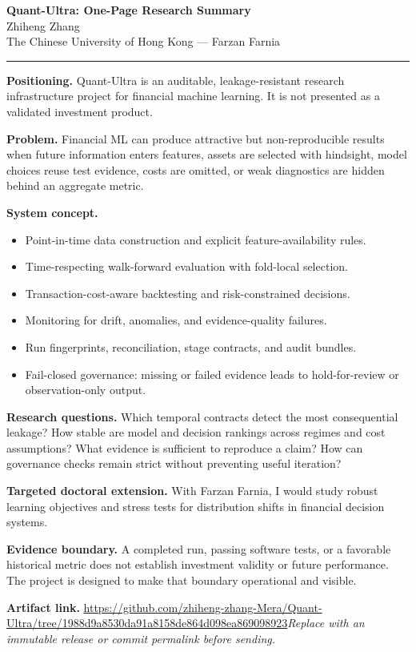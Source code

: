 \documentclass[11pt]{article}
\newcommand{\ApplicantName}{Zhiheng Zhang}
\newcommand{\ApplicantGitHub}{\url{https://github.com/zhiheng-zhang-Mera/Quant-Ultra/tree/1988d9a8530da91a8158de864d098ea869098923}}
\begin{document}
\begin{center}
{\LARGE\bfseries Quant-Ultra: One-Page Research Summary}\\[0.25em]
{\large \ApplicantName}\\
The Chinese University of Hong Kong --- Farzan Farnia
\end{center}
\vspace{0.35em}\hrule\vspace{0.65em}

\textbf{Positioning.} Quant-Ultra is an auditable, leakage-resistant research infrastructure project for financial machine learning. It is not presented as a validated investment product.

\textbf{Problem.} Financial ML can produce attractive but non-reproducible results when future information enters features, assets are selected with hindsight, model choices reuse test evidence, costs are omitted, or weak diagnostics are hidden behind an aggregate metric.

\textbf{System concept.}
\begin{itemize}
\item Point-in-time data construction and explicit feature-availability rules.
\item Time-respecting walk-forward evaluation with fold-local selection.
\item Transaction-cost-aware backtesting and risk-constrained decisions.
\item Monitoring for drift, anomalies, and evidence-quality failures.
\item Run fingerprints, reconciliation, stage contracts, and audit bundles.
\item Fail-closed governance: missing or failed evidence leads to hold-for-review or observation-only output.
\end{itemize}

\textbf{Research questions.} Which temporal contracts detect the most consequential leakage? How stable are model and decision rankings across regimes and cost assumptions? What evidence is sufficient to reproduce a claim? How can governance checks remain strict without preventing useful iteration?

\textbf{Targeted doctoral extension.} With Farzan Farnia, I would study robust learning objectives and stress tests for distribution shifts in financial decision systems.

\textbf{Evidence boundary.} A completed run, passing software tests, or a favorable historical metric does not establish investment validity or future performance. The project is designed to make that boundary operational and visible.

\textbf{Artifact link.} \ApplicantGitHub\quad \textit{Replace with an immutable release or commit permalink before sending.}
\end{document}
